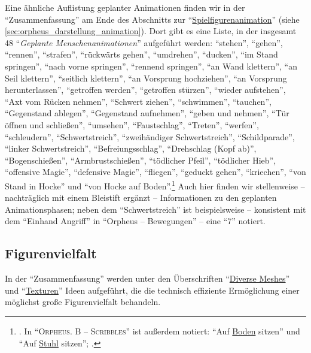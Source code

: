 \documentclass[a5paper,pagesize,numbers=noenddot]{scrbook}
\begin{document}
Eine ähnliche Auflistung geplanter Animationen finden wir in der \enquote{Zusammenfassung} am Ende des Abschnitts zur \enquote{\uline{Spielfigurenanimation}} (siehe \autoref{sec:orpheus_darstellung_animation}).
Dort gibt es eine Liste, in der insgesamt 48 \enquote{\textit{Geplante Menschenanimationen}} aufgeführt werden:
\enquote{stehen}, \enquote{gehen}, \enquote{rennen}, \enquote{strafen}, \enquote{rückwärts gehen}, \enquote{umdrehen}, \enquote{ducken}, \enquote{im Stand springen}, \enquote{nach vorne springen}, \enquote{rennend springen}, \enquote{an Wand klettern}, \enquote{an Seil klettern}, \enquote{seitlich klettern}, \enquote{an Vorsprung hochziehen}, \enquote{an Vorsprung herunterlassen}, \enquote{getroffen werden}, \enquote{getroffen stürzen}, \enquote{wieder aufstehen}, \enquote{Axt vom Rücken nehmen}, \enquote{Schwert ziehen}, \enquote{schwimmen}, \enquote{tauchen}, \enquote{Gegenstand ablegen}, \enquote{Gegenstand aufnehmen}, \enquote{geben und nehmen}, \enquote{Tür öffnen und schließen}, \enquote{umsehen}, \enquote{Faustschlag}, \enquote{Treten}, \enquote{werfen}, \enquote{schleudern}, \enquote{Schwertstreich}, \enquote{zweihändiger Schwertstreich}, \enquote{Schildparade}, \enquote{linker Schwertstreich}, \enquote{Befreiungsschlag}, \enquote{Drehschlag (Kopf ab)}, \enquote{Bogenschießen}, \enquote{Armbrustschießen}, \enquote{tödlicher Pfeil}, \enquote{tödlicher Hieb}, \enquote{offensive Magie}, \enquote{defensive Magie}, \enquote{fliegen}, \enquote{geduckt gehen}, \enquote{kriechen}, \enquote{von Stand in Hocke} und \enquote{von Hocke auf Boden}.\footnote{\autocite[S.~1\,f.]{orpheus_zusammenfassung_1996}. In \enquote{\textsc{Orpheus. B -- Scribbles}} ist außerdem notiert: \enquote{Auf \uline{Boden} sitzen} und \enquote{Auf \uline{Stuhl} sitzen}; \autocite[S.~8]{orpheus_b_scribbles}.}
Auch hier finden wir stellenweise -- nachträglich mit einem Bleistift ergänzt -- Informationen zu den geplanten Animationsphasen; neben dem \enquote{Schwertstreich}\autocite[S.~1]{orpheus_zusammenfassung_1996} ist beispielsweise -- konsistent mit dem \enquote{Einhand Angriff}\autocite[S.~1]{orpheus_bewegungen} in \enquote{Orpheus -- Bewegungen} -- eine \enquote{7} notiert.


\subsection{Figurenvielfalt}\label{sec:orpheus_darstellung_figurenvielfalt}
In der \enquote{Zusammenfassung} werden unter den Überschriften \enquote{\uline{Diverse Meshes}} und \enquote{\uline{Texturen}} Ideen aufgeführt, die die technisch effiziente Ermöglichung einer möglichst große Figurenvielfalt behandeln.
\end{document}
